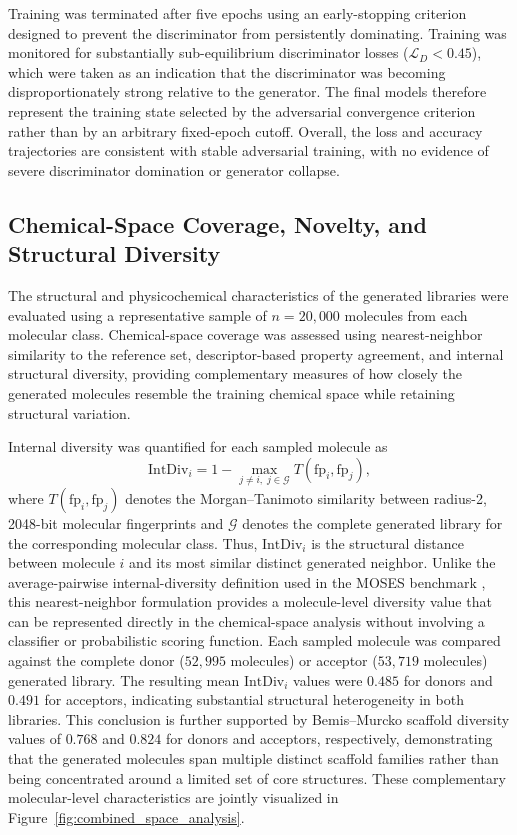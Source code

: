 \documentclass[12pt]{article}
\begin{document}
Training was terminated after five epochs using an early-stopping criterion designed to prevent the discriminator from persistently dominating. Training was monitored for substantially sub-equilibrium discriminator losses ($\mathcal{L}_D < 0.45$), which were taken as an indication that the discriminator was becoming disproportionately strong relative to the generator. The final models therefore represent the training state selected by the adversarial convergence criterion rather than by an arbitrary fixed-epoch cutoff. Overall, the loss and accuracy trajectories are consistent with stable adversarial training, with no evidence of severe discriminator domination or generator collapse.

\subsection{Chemical-Space Coverage, Novelty, and Structural Diversity}
The structural and physicochemical characteristics of the generated libraries were evaluated using a representative sample of $n = 20{,}000$ molecules from each molecular class. Chemical-space coverage was assessed using nearest-neighbor similarity to the reference set, descriptor-based property agreement, and internal structural diversity, providing complementary measures of how closely the generated molecules resemble the training chemical space while retaining structural variation.

Internal diversity was quantified for each sampled molecule as
\begin{equation}
\mathrm{IntDiv}_i = 1 - \max_{j \neq i,\; j \in \mathcal{G}} 
T(\mathrm{fp}_i, \mathrm{fp}_j),
\end{equation}
where $T(\mathrm{fp}_i, \mathrm{fp}_j)$ denotes the Morgan--Tanimoto similarity between radius-2, 2048-bit molecular fingerprints and $\mathcal{G}$ denotes the complete generated library for the corresponding molecular class. Thus, $\mathrm{IntDiv}_i$ is the structural distance between molecule $i$ and its most similar distinct generated neighbor. Unlike the average-pairwise internal-diversity definition used in the MOSES benchmark \cite{moses}, this nearest-neighbor formulation provides a molecule-level diversity value that can 
be represented directly in the chemical-space analysis without involving a classifier or probabilistic scoring function. Each sampled molecule was compared against the complete donor ($52{,}995$ molecules) or acceptor ($53{,}719$ molecules) generated library. The resulting mean $\mathrm{IntDiv}_i$ values were $0.485$ for donors and $0.491$ for acceptors, indicating substantial structural heterogeneity in both libraries. This conclusion is further supported by Bemis--Murcko scaffold diversity values of $0.768$ and $0.824$ for donors and acceptors, respectively, demonstrating that the generated molecules span multiple distinct scaffold families rather than being concentrated around a limited set of core structures. These complementary molecular-level characteristics are jointly visualized in Figure~\ref{fig:combined_space_analysis}.
\end{document}
